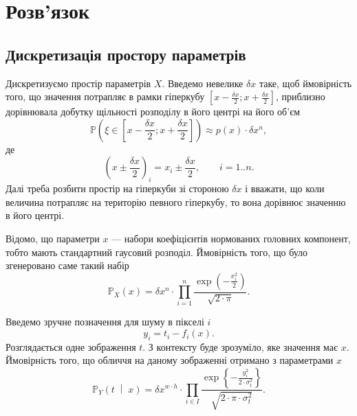 \section{Розв'язок}

\subsection{Дискретизація простору параметрів}

Дискретизуємо простір параметрів $X$.
Введемо невелике $\delta x$ таке,
щоб ймовірність того, що значення потрапляє в рамки гіперкубу
$\left[ x - \frac{\delta x}{2}; x + \frac{\delta x}{2} \right]$,
приблизно дорівнювала добутку щільності розподілу в його центрі
на його об'єм
\begin{equation*}
  \mathbb{P}\left( \xi \in \left[ x - \frac{\delta x}{2};
                                  x + \frac{\delta x}{2} \right] \right)
  \approx p\left( x \right) \cdot \delta x^n,
\end{equation*}
де
\begin{equation*}
  \left( x \pm \frac{\delta x}{2} \right)_i = x_i \pm \frac{\delta x}{2},\qquad
  i = 1..n.
\end{equation*}
Далі треба розбити простір на гіперкуби
зі стороною $\delta x$ і вважати,
що коли величина потрапляє на територію певного гіперкубу,
то вона дорівнює значенню в його центрі.

Відомо, що параметри $x$ --- набори коефіцієнтів нормованих головних компонент,
тобто мають стандартний гаусовий розподіл.
Ймовірність того, що було згенеровано саме такий набір
\begin{equation*}
  \mathbb{P}_X\left( x \right)
  = \delta x^n \cdot \prod_{i=1}^n
    \frac{\exp{\left( - \frac{x_i^2}{2} \right)}}{\sqrt{2 \cdot \pi}}.
\end{equation*}

Введемо зручне позначення для шуму в пікселі $i$
\begin{equation*}
  y_i = t_i - f_i\left( x \right).
\end{equation*}
Розглядається одне зображення $t$.
З контексту буде зрозуміло, яке значення має $x$.
Ймовірність того, що обличчя на даному зображенні отримано з параметрами $x$
\begin{equation*}
  \mathbb{P}_Y\left( t \;\middle|\; x \right)
  = \delta x^{w \cdot h} \cdot \prod_{i \in I}
    \frac{\exp{\left\{- \frac{y_i^2}
           {2 \cdot \sigma^2_t} \right\}}}
           {\sqrt{2 \cdot \pi \cdot \sigma^2_t}}.
\end{equation*}

